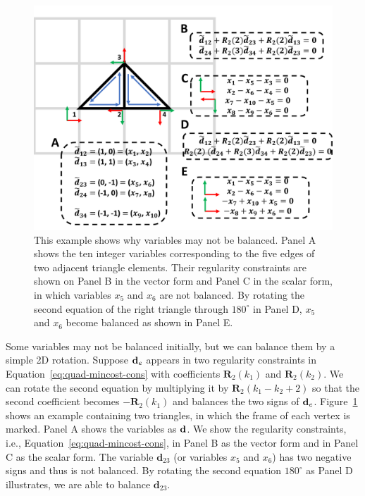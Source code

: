 \begin{figure}
\centering
\includegraphics[width=0.6\linewidth]{quadriflow/diagram/balance.pdf}
\caption{This example shows why variables may not be balanced. Panel A shows the ten integer variables corresponding to the five edges of two adjacent triangle elements. Their regularity constraints are shown on Panel B in the vector form and Panel C in the scalar form, in which variables $x_5$ and $x_6$ are not balanced.  By rotating the second equation of the right triangle through $180^\circ$ in Panel D, $x_5$ and $x_6$ become balanced as shown in Panel E.}
\label{fig:quad-balance}
\end{figure}

Some variables may not be balanced initially, but we can balance them by a simple 2D rotation. Suppose ${\mathbf{d}}_e$ appears in two regularity constraints in Equation~\eqref{eq:quad-mincost-cons} with coefficients $\mathbf{R}_2(k_1)$ and $\mathbf{R}_2(k_2)$. We can rotate the second equation by multiplying it by $\mathbf{R}_2(k_1-k_2+2)$ so that the second coefficient becomes $-\mathbf{R}_2(k_1)$ and balances the two signs of ${\mathbf{d}}_e$. Figure~\ref{fig:quad-balance} shows an example containing two triangles, in which the frame of each vertex is marked. Panel A shows the variables as ${{\mathbf{d}}}$. We show the regularity constraints, i.e., Equation~\eqref{eq:quad-mincost-cons}, in Panel B as the vector form and in Panel C as the scalar form. The variable ${\textbf{d}}_{23}$ (or variables $x_5$ and $x_6$) has two negative signs and thus is not balanced. By rotating the second equation $180^\circ$ as Panel D illustrates, we are able to balance ${\textbf{d}}_{23}$.


